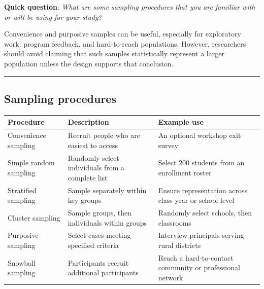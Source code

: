 \documentclass[
  letterpaper,
  DIV=11,
  numbers=noendperiod]{scrartcl}
\begin{document}
\textbf{Quick question}: \emph{What are some sampling procedures that
you are familiar with or will be using for your study?}

Convenience and purposive samples can be useful, especially for
exploratory work, program feedback, and hard-to-reach populations.
However, researchers should avoid claiming that such samples
statistically represent a larger population unless the design supports
that conclusion.

\begin{center}\rule{0.5\linewidth}{0.5pt}\end{center}

\subsection{Sampling procedures}\label{sampling-procedures-2}

\begin{longtable}[]{@{}
  >{\raggedright\arraybackslash}p{}
  >{\raggedright\arraybackslash}p{}
  >{\raggedright\arraybackslash}p{}@{}}
\toprule\noalign{}
\begin{minipage}[b]{\linewidth}\raggedright
Procedure
\end{minipage} & \begin{minipage}[b]{\linewidth}\raggedright
Description
\end{minipage} & \begin{minipage}[b]{\linewidth}\raggedright
Example use
\end{minipage} \\
\midrule\noalign{}
\endhead
\bottomrule\noalign{}
\endlastfoot
Convenience sampling & Recruit people who are easiest to access & An
optional workshop exit survey \\
Simple random sampling & Randomly select individuals from a complete
list & Select 200 students from an enrollment roster \\
Stratified sampling & Sample separately within key groups & Ensure
representation across class year or school level \\
Cluster sampling & Sample groups, then individuals within groups &
Randomly select schools, then classrooms \\
Purposive sampling & Select cases meeting specified criteria & Interview
principals serving rural districts \\
Snowball sampling & Participants recruit additional participants & Reach
a hard-to-contact community or professional network \\
\end{longtable}
\end{document}
